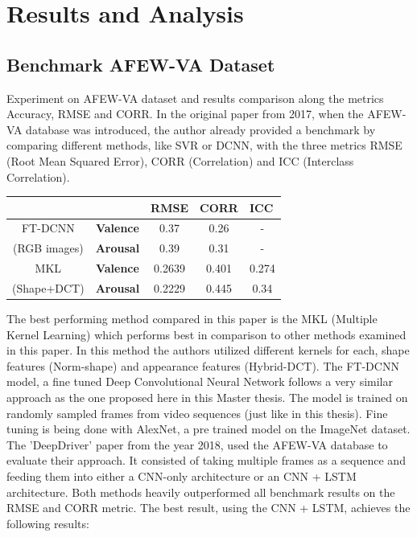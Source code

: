 \chapter{Results and Analysis}
\section{Benchmark AFEW-VA Dataset}
Experiment on AFEW-VA dataset and results comparison along the metrics Accuracy, RMSE and CORR.
\newline
In the original paper from 2017, when the AFEW-VA database \cite{Kossaifi:2017:AFEW-VADatabase} was introduced, the author already provided a benchmark by comparing different methods, like SVR or DCNN, with the three metrics RMSE (Root Mean Squared Error), CORR (Correlation) and ICC (Interclass Correlation). 

\begin{table}[H]
\centering
\begin{tabular}{cc|ccc}
\multicolumn{1}{l}{} & \multicolumn{1}{l|}{\textbf{}} & \multicolumn{1}{l}{\cellcolor[HTML]{CBCEFB}\textbf{RMSE}} & \multicolumn{1}{l}{\cellcolor[HTML]{CBCEFB}\textbf{CORR}} & \multicolumn{1}{l}{\cellcolor[HTML]{CBCEFB}\textbf{ICC}} \\ \hline
FT-DCNN & \cellcolor[HTML]{F8FF00}\textbf{Valence} & 0.37 & 0.26 & - \\
(RGB images) & \cellcolor[HTML]{F8FF00}\textbf{Arousal} & 0.39 & 0.31 & - \\ \hline
MKL & \cellcolor[HTML]{F8FF00}\textbf{Valence} & 0.2639 & 0.401 & 0.274 \\
(Shape+DCT) & \cellcolor[HTML]{F8FF00}\textbf{Arousal} & 0.2229 & 0.445 & 0.34
\end{tabular}
\end{table}

The best performing method compared in this paper is the MKL (Multiple Kernel Learning) which performs best in comparison to other methods examined in this paper. In this method the authors utilized different kernels for each, shape features (Norm-shape) and appearance features (Hybrid-DCT).
\newline\newline
The FT-DCNN model, a fine tuned Deep Convolutional Neural Network follows a very similar approach as the one proposed here in this Master thesis. The model is trained on randomly sampled frames from video sequences (just like in this thesis). Fine tuning is being done with AlexNet, a pre trained model on the ImageNet dataset.
\newline\newline
The 'DeepDriver' paper \cite{Theagarajan:2018:DeepDriver} from the year 2018, used the AFEW-VA database to evaluate their approach. It consisted of taking multiple frames as a sequence and feeding them into either a CNN-only architecture or an CNN + LSTM architecture. Both methods heavily outperformed all benchmark results on the RMSE and CORR metric. The best result, using the CNN + LSTM, achieves the following results:


